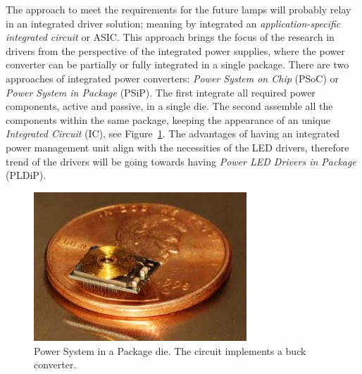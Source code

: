 The approach to meet the requirements for the future lamps will probably relay in an integrated driver solution; meaning by integrated an \emph{application-specific integrated circuit} or ASIC. This approach brings the focus of the research in drivers  from the perspective of the integrated power supplies, where the power converter can be partially or fully integrated in a single package. There are two approaches of integrated power converters: \emph{Power System on Chip} (PSoC) or  \emph{Power System in Package} (PSiP). The first integrate all required power components, active and passive, in a single die. The second assemble all the components within the same package, keeping the appearance of an unique \emph{Integrated Circuit} (IC), see Figure~\ref{fig:psoc_example}. The advantages of having an integrated power management unit align with the necessities of the LED drivers, therefore trend of the drivers will be going towards having \emph{Power LED Drivers in Package} (PLDiP).

\begin{figure}[!h]
    \centering
    \includegraphics[width=8cm]{./0_intro/img/FSolzbacher01.jpg}
    \caption{Power System in a Package die. The circuit implements a buck converter.}
    \label{fig:psoc_example}
\end{figure}


